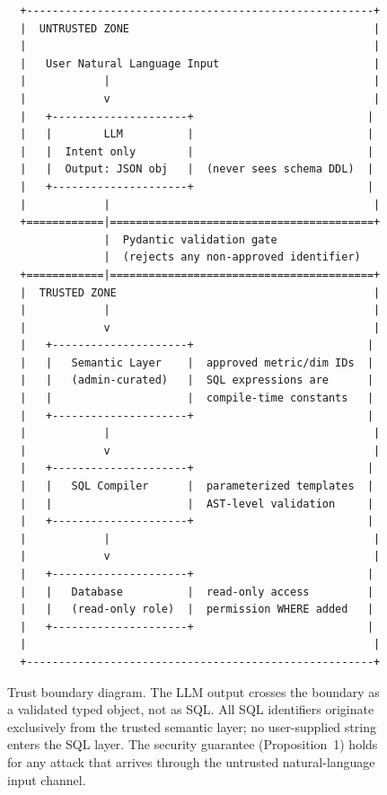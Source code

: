 \documentclass[11pt]{article}
\begin{document}
\begin{figure}[h]
\centering
\begin{verbatim}
  +------------------------------------------------------+
  |  UNTRUSTED ZONE                                      |
  |                                                      |
  |   User Natural Language Input                        |
  |            |                                         |
  |            v                                         |
  |   +---------------------+                           |
  |   |        LLM          |                           |
  |   |  Intent only        |                           |
  |   |  Output: JSON obj   |  (never sees schema DDL)  |
  |   +---------------------+                           |
  |            |                                         |
  +============|=========================================+
               |  Pydantic validation gate
               |  (rejects any non-approved identifier)
  +============|=========================================+
  |  TRUSTED ZONE                                        |
  |            |                                         |
  |            v                                         |
  |   +---------------------+                           |
  |   |   Semantic Layer    |  approved metric/dim IDs  |
  |   |   (admin-curated)   |  SQL expressions are      |
  |   |                     |  compile-time constants   |
  |   +---------------------+                           |
  |            |                                         |
  |            v                                         |
  |   +---------------------+                           |
  |   |   SQL Compiler      |  parameterized templates  |
  |   |                     |  AST-level validation     |
  |   +---------------------+                           |
  |            |                                         |
  |            v                                         |
  |   +---------------------+                           |
  |   |   Database          |  read-only access         |
  |   |   (read-only role)  |  permission WHERE added   |
  |   +---------------------+                           |
  |                                                      |
  +------------------------------------------------------+
\end{verbatim}
\caption{Trust boundary diagram. The LLM output crosses the boundary as a validated typed object, not as SQL. All SQL identifiers originate exclusively from the trusted semantic layer; no user-supplied string enters the SQL layer. The security guarantee (Proposition~1) holds for any attack that arrives through the untrusted natural-language input channel.}\label{fig:trust}
\end{figure}
\end{document}
